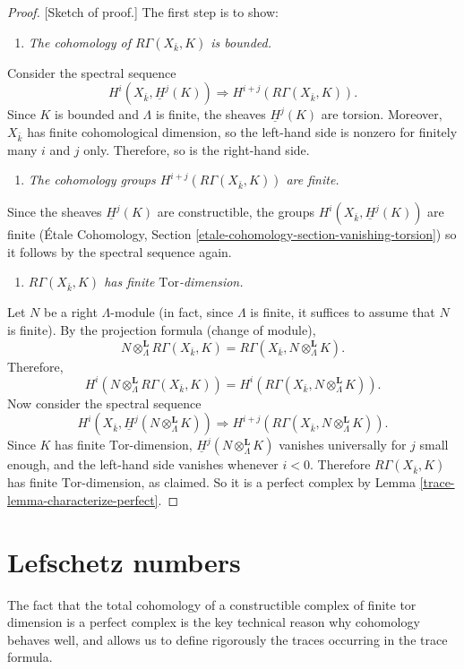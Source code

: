 \begin{proof}
[Sketch of proof.]
The first step is to show:
\begin{enumerate}
\item[(1)]
{\it The cohomology of $R\Gamma(X_{\bar k}, K)$ is bounded.}
\end{enumerate}
Consider the spectral sequence
$$
H^i(X_{\bar k}, \underline H^j(K))
\Rightarrow
H^{i+j} (R\Gamma(X_{\bar k}, K)).
$$
Since $K$ is bounded and $\Lambda$ is finite, the sheaves $\underline H^j(K)$
are torsion. Moreover, $X_{\bar k}$ has finite cohomological dimension, so the
left-hand side is nonzero for finitely many $i$ and $j$ only. Therefore, so is
the right-hand side.
\begin{enumerate}
\item[(2)]
{\it The cohomology groups $H^{i+j} (R\Gamma(X_{\bar k}, K))$ are finite.}
\end{enumerate}
Since the sheaves $\underline H^j(K)$ are constructible, the groups
$H^i(X_{\bar k}, \underline H^j(K))$ are finite
(\'Etale Cohomology, Section \ref{etale-cohomology-section-vanishing-torsion})
so it follows by the spectral sequence again.
\begin{enumerate}
\item[(3)]
{\it $R\Gamma(X_{\bar k}, K)$ has finite $\text{Tor}$-dimension.}
\end{enumerate}
Let $N$ be a right $\Lambda$-module (in fact, since $\Lambda$ is finite, it
suffices to assume that $N$ is finite). By the projection formula (change of
module),
$$
N \otimes^\mathbf{L}_\Lambda R \Gamma(X_{\bar k}, K) = R\Gamma(X_{\bar k},
N \otimes^\mathbf{L}_\Lambda K).
$$
Therefore,
$$
H^i (N \otimes^\mathbf{L}_\Lambda R\Gamma(X_{\bar k}, K)) = H^i(R\Gamma(X_{\bar
k}, N \otimes_{\Lambda}^\mathbf{L} K)).
$$
Now consider the spectral sequence
$$
H^i (X_{\bar k}, \underline H^j (N \otimes_{\Lambda}^\mathbf{L} K))
\Rightarrow
H^{i+j}(R\Gamma(X_{\bar k}, N \otimes_{\Lambda}^\mathbf{L} K)).
$$
Since $K$ has finite $\text{Tor}$-dimension, $\underline H^j
(N \otimes_{\Lambda}^\mathbf{L} K)$ vanishes universally for $j$ small enough,
and the left-hand side vanishes whenever $i < 0$. Therefore $R\Gamma(X_{\bar
k}, K)$ has finite $\text{Tor}$-dimension, as claimed. So it is a perfect
complex by Lemma \ref{trace-lemma-characterize-perfect}.
\end{proof}

\section{Lefschetz numbers}
\label{trace-section-lefschetz-numbers}
The fact that the total cohomology of a constructible complex of finite tor
dimension is a perfect complex is the key technical reason why cohomology
behaves well, and allows us to define rigorously the traces occurring in the
trace formula.

